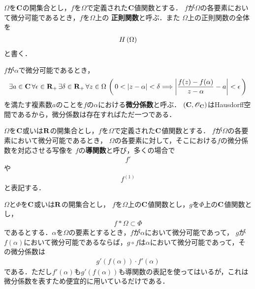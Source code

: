 	\begin{screen}
		\begin{dfn}[正則関数]
			$\Omega$を$\mathbf{C}$の開集合とし，$f$を$\Omega$で定義された$\mathbf{C}$値関数とする．
			$f$が$\Omega$の各要素において微分可能であるとき，$f$を$\Omega$上の
			{\bf 正則関数}と呼ぶ．また
			$\Omega$上の正則関数の全体を
			\begin{align}
				H\left(\Omega\right)
			\end{align}
			と書く．
		\end{dfn}
	\end{screen}
	
	$f$が$\alpha$で微分可能であるとき，
	\begin{align}
		\exists a \in \mathbf{C}\, \forall \epsilon \in \mathbf{R}_+\, \exists \delta \in \mathbf{R}_+\,
		\forall z \in \Omega\, 
		\left(\, 0 < |z - \alpha| < \delta \Longrightarrow 
		\left| \frac{f(z) - f(\alpha)}{z-\alpha} - a\right| < \epsilon\, \right)
	\end{align}
	を満たす複素数$a$のことを$f$の$\alpha$における{\bf 微分係数}と呼ぶ．
	$(\mathbf{C},\mathscr{O}_{\mathbf{C}})$はHausdorff空間であるから，微分係数は存在すればただ一つである．
	
	\begin{screen}
		\begin{dfn}[導関数]
			$\Omega$を$\mathbf{C}$或いは$\mathbf{R}$の開集合とし，$f$を$\Omega$で定義された$\mathbf{C}$値関数とする．
			$f$が$\Omega$の各要素において微分可能であるとき，
			$\Omega$の各要素に対して，そこにおける$f$の微分係数を対応させる写像を
			$f$の{\bf 導関数}と呼び，多くの場合で
			\begin{align}
				f'
			\end{align}
			や
			\begin{align}
				f^{(1)}
			\end{align}
			と表記する．
		\end{dfn}
	\end{screen}
	
	\begin{screen}
		\begin{thm}[連鎖律]
			$\Omega$と$\Phi$を$\mathbf{C}$或いは$\mathbf{R}$の開集合とし，
			$f$を$\Omega$上の$\mathbf{C}$値関数とし，$g$を$\Phi$上の$\mathbf{C}$値関数とし，
			\begin{align}
				f \ast \Omega \subset \Phi
			\end{align}
			であるとする．$\alpha$を$\Omega$の要素とするとき，$f$が$\alpha$において微分可能であって，
			$g$が$f(\alpha)$において微分可能であるならば，$g \circ f$は$\alpha$において微分可能であって，その微分係数は
			\begin{align}
				g'(f(\alpha)) \cdot f'(\alpha)
			\end{align}
			である．ただし$f'(\alpha)$も$g'(f(\alpha))$も導関数の表記を使ってはいるが，これは微分係数を表すため便宜的に用いているだけである．
		\end{thm}
	\end{screen}
	
